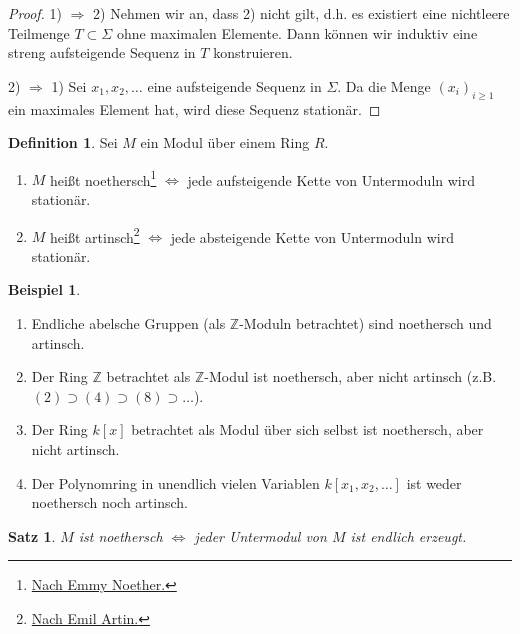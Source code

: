 \documentclass[reqno,12pt]{article}
\numberwithin{equation}{section}
\newcommand{\bZ}{\mathbb{Z}}
\theoremstyle{plain}
\newtheorem{proposition}[thm]{Satz}
\theoremstyle{definition}
\newtheorem{definition}[thm]{Definition}
\newtheorem{example}[thm]{Beispiel}
\begin{document}
\begin{proof}
1) $\Rightarrow$ 2) Nehmen wir an, dass 2) nicht gilt, d.h. es existiert eine nichtleere Teilmenge $T \subset \Sigma$ ohne maximalen Elemente. Dann können wir induktiv eine streng aufsteigende Sequenz in $T$ konstruieren.

2) $\Rightarrow$ 1) Sei $x_1, x_2, \dots$ eine aufsteigende Sequenz in $\Sigma$. Da die Menge $(x_i)_{i \geq 1}$ ein maximales Element hat, wird diese Sequenz stationär.
\end{proof}


\begin{definition}
Sei $M$ ein Modul über einem Ring $R$.
\begin{enumerate}
\item $M$ heißt {\sf noethersch}\footnote{\href{https://en.wikipedia.org/wiki/Emmy_Noether}{Nach Emmy Noether.}} $\iff$ jede aufsteigende Kette von Untermoduln wird stationär.
\item $M$ heißt {\sf artinsch}\footnote{\href{https://en.wikipedia.org/wiki/Emil_Artin}{Nach Emil Artin.}} $\iff$ jede absteigende Kette von Untermoduln wird stationär.
\end{enumerate}
\end{definition}

\begin{example}
\
\begin{enumerate}
\item Endliche abelsche Gruppen (als $\bZ$-Moduln betrachtet) sind noethersch und artinsch.
\item Der Ring $\bZ$ betrachtet als $\bZ$-Modul ist noethersch, aber nicht artinsch (z.B. $(2) \supset (4) \supset (8) \supset \dots$).
\item Der Ring $k[x]$ betrachtet als Modul über sich selbst ist noethersch, aber nicht artinsch.
\item Der Polynomring in unendlich vielen Variablen $k[x_1, x_2, \dots ]$ ist weder noethersch noch artinsch.
\end{enumerate}
\end{example}



\begin{proposition}\label{proposition-noetherian-finitely-generated-submodules}
$M$ ist noethersch $\iff$ jeder Untermodul von $M$ ist endlich erzeugt.
\end{proposition}
\end{document}
